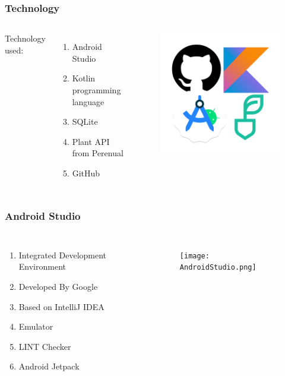 \documentclass[xcolor=table]{beamer}
\begin{document}
\begin{frame}[fragile]
\frametitle{Technology}
\begin{columns}
Technology used:
   \begin{enumerate}
    \item Android Studio
    \item Kotlin programming language
    \item SQLite
    \item Plant API from Perenual
    \item GitHub
  \end{enumerate}
    \begin{figure}[H]
    \includegraphics[width = .8\linewidth]{technologies.png}
    \end{figure}
    \end{columns}
\end{frame}

\begin{frame}[fragile]
\frametitle{Android Studio}
\begin{columns}
   \begin{enumerate}
    \item Integrated Development Environment
    \item Developed By Google
    \item Based on IntelliJ IDEA
    \item Emulator
    \item LINT Checker
    \item Android Jetpack
  \end{enumerate}
    \begin{figure}[H]
    \texttt{[image: AndroidStudio.png]}
    \end{figure}
    \end{columns}
\end{frame}
\end{document}
